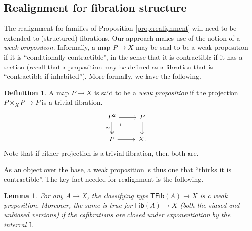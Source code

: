 \documentclass[11pt,reqno]{amsart}
\renewcommand{\to}{\ensuremath{\rightarrow}}
\newcommand{\I}{\ensuremath{\mathrm{I}}}
\newcommand{\Fib}{\ensuremath{\mathsf{Fib}}}
\newcommand{\TFib}{\ensuremath{\mathsf{TFib}}}
\newtheorem{lemma}[theorem]{Lemma}
\theoremstyle{remark}
\theoremstyle{definition}
\newtheorem{definition}[theorem]{Definition}
\newcommand{\pbmark}{\ar[dr, phantom, "\lrcorner" very near start, shift right=.5ex]}	%
\begin{document}

\subsection*{Realignment for fibration structure}\label{sec:realignment}

The realignment for families of Proposition \ref{prop:realignment} will need to be extended to (structured) fibrations. Our approach makes use of the notion of a \emph{weak proposition}.  Informally, a map $P\to X$ may be said to be a weak proposition if it is ``conditionally contractible'', in the sense that it is contractible if it has a section (recall that a proposition may be defined as a fibration that is ``contractible if inhabited'').  More formally, we have the following.

\begin{definition}
A map $P\to X$ is said to be a \emph{weak proposition} if the projection $P\times_X P\to P$ is a trivial fibration.
\begin{equation}\label{diagram:weakprop}
\begin{tikzcd}
P^2 \ar[d,two heads,swap,"{\sim}"] \ar[r]  \pbmark & P \ar[d] \\
P \ar[r] &  X.
\end{tikzcd}
\end{equation}
Note that if either projection is a trivial fibration, then both are.
\end{definition}

As an object over the base, a weak proposition is thus one that ``thinks it is contractible''.  The key fact needed for realignment is the following.

\begin{lemma}\label{lemma:Fibweakprop} For any $A\to X$, the classifying type $\TFib(A) \to X$ is a weak proposition.  Moreover, the same is true for $\Fib(A)\to X$ (both the biased and unbiased versions) if the cofibrations are closed under exponentiation by the interval $\I$.
\end{lemma}
\end{document}
